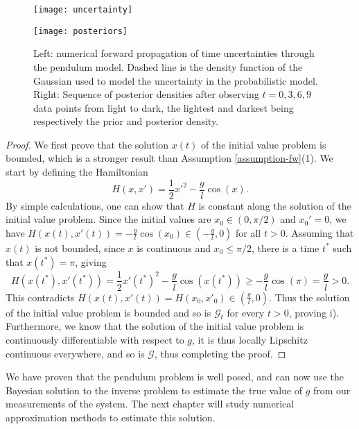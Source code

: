 \begin{figure}[t!]
  \begin{minipage}{.5\textwidth}
    \texttt{[image: uncertainty]}
  \end{minipage}
  \begin{minipage}{.5\textwidth}
    \texttt{[image: posteriors]}
  \end{minipage}
  \caption{Left: numerical forward propagation of time uncertainties through the pendulum model. Dashed line is the density function of the Gaussian used to model the uncertainty in the probabilistic model. Right: Sequence of posterior densities after observing $t=0, 3, 6, 9$ data points from light to dark, the lightest and darkest being respectively the prior and posterior density. }
  \label{uncertainty-posteriors}
\end{figure}


\begin{proof}
  We first prove that the solution $x(t)$ of the initial value problem is bounded, which is a stronger result than Assumption \ref{assumption-fw}(1). We start by defining the Hamiltonian
  \begin{equation*}
    H(x, x') = \frac12 x'^2 - \frac{g}{l}\cos(x).
  \end{equation*}
  By simple calculations, one can show that $H$ is constant along the solution of the initial value problem. Since the initial values are $x_0 \in (0, \pi/2)$ and $x_0' = 0$, we have $H(x(t), x'(t)) = -\frac{g}{l}\cos(x_0) \in (-\frac{g}{l}, 0)$ for all $t > 0$. Assuming that $x(t)$ is not bounded, since $x$ is continuous and $x_0 \le \pi/2$, there is a time $t^*$ such that $x(t^*) = \pi$, giving
  \begin{equation*}
    H(x(t^*), x'(t^*)) = \frac12 x'(t^*)^2 - \frac{g}{l}\cos(x(t^*)) \ge -\frac{g}{l}\cos(\pi) = \frac{g}{l} > 0.
  \end{equation*}
  This contradicts $H(x(t), x'(t)) = H(x_0, x'_0) \in (\frac{g}{l}, 0)$. Thus the solution of the initial value problem is bounded and so is $\mathcal{G}_t$ for every $t > 0$, proving i).
  Furthermore, we know that the solution of the initial value problem is continuously differentiable with respect to $g$, it is thus locally Lipschitz continuous everywhere, and so is $\mathcal{G}$, thus completing the proof.
\end{proof}

We have proven that the pendulum problem is well posed, and can now use the Bayesian solution to the inverse problem to estimate the true value of $g$ from our measurements of the system. The next chapter will study numerical approximation methods to estimate this solution.

